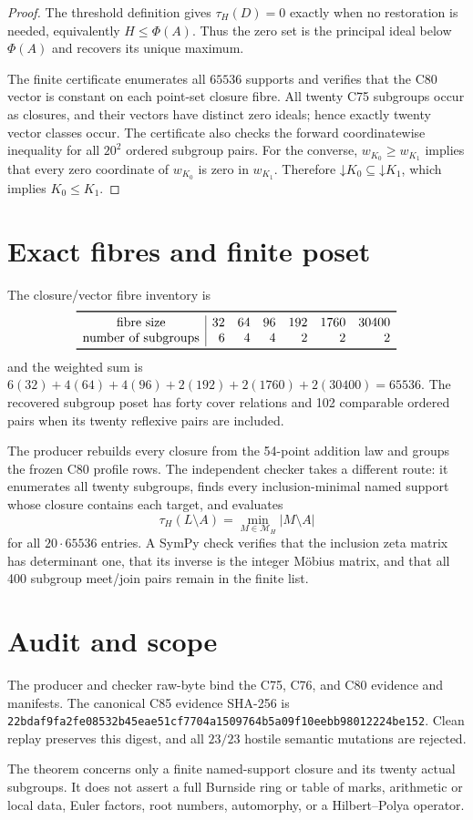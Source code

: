 \documentclass[10pt]{article}
\newcommand{\Phiop}{\Phi}
\begin{document}
\begin{proof}
The threshold definition gives $\tau_H(D)=0$ exactly when no restoration is
needed, equivalently $H\leq\Phiop(A)$.  Thus the zero set is the principal
ideal below $\Phiop(A)$ and recovers its unique maximum.

The finite certificate enumerates all $65536$ supports and verifies that the
C80 vector is constant on each point-set closure fibre.  All twenty C75
subgroups occur as closures, and their vectors have distinct zero ideals;
hence exactly twenty vector classes occur.  The certificate also checks the
forward coordinatewise inequality for all $20^2$ ordered subgroup pairs.  For
the converse, $w_{K_0}\geq w_{K_1}$ implies that every zero coordinate of
$w_{K_0}$ is zero in $w_{K_1}$.  Therefore
$\mathord\downarrow K_0\subseteq\mathord\downarrow K_1$, which implies
$K_0\leq K_1$.
\end{proof}

\section{Exact fibres and finite poset}
The closure/vector fibre inventory is
\[
\begin{array}{c|rrrrrr}
\toprule
\text{fibre size}&32&64&96&192&1760&30400\\
\text{number of subgroups}&6&4&4&2&2&2\\
\bottomrule
\end{array}
\]
and the weighted sum is
$6(32)+4(64)+4(96)+2(192)+2(1760)+2(30400)=65536$.
The recovered subgroup poset has forty cover relations and 102 comparable
ordered pairs when its twenty reflexive pairs are included.

The producer rebuilds every closure from the 54-point addition law and groups
the frozen C80 profile rows.  The independent checker takes a different
route: it enumerates all twenty subgroups, finds every inclusion-minimal named
support whose closure contains each target, and evaluates
\[
 \tau_H(L\setminus A)=\min_{M\in\mathcal M_H}|M\setminus A|
\]
for all $20\cdot65536$ entries.  A SymPy check verifies that the inclusion
zeta matrix has determinant one, that its inverse is the integer M\"obius
matrix, and that all 400 subgroup meet/join pairs remain in the finite list.

\section{Audit and scope}
The producer and checker raw-byte bind the C75, C76, and C80 evidence and
manifests.  The canonical C85 evidence SHA-256 is
\texttt{22bdaf9fa2fe08532b45eae51cf7704a1509764b5a09f10eebb98012224be152}.
Clean replay preserves this digest, and all $23/23$ hostile semantic mutations
are rejected.

The theorem concerns only a finite named-support closure and its twenty
actual subgroups.  It does not assert a full Burnside ring or table of marks,
arithmetic or local data, Euler factors, root numbers, automorphy, or a
Hilbert--Polya operator.
\end{document}
